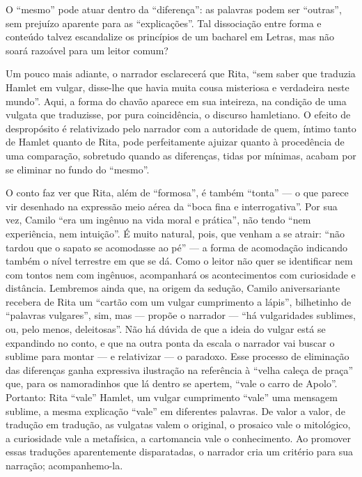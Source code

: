 O ``mesmo'' pode atuar dentro da ``diferença'': as palavras podem ser
``outras'', sem prejuízo aparente para as ``explicações''. Tal
dissociação entre forma e conteúdo talvez escandalize os princípios de
um bacharel em Letras, mas não soará razoável para um leitor comum?

Um pouco mais adiante, o narrador esclarecerá que Rita, ``sem saber que
traduzia Hamlet em vulgar, disse-lhe que havia muita cousa misteriosa e
verdadeira neste mundo''. Aqui, a forma do chavão aparece em sua
inteireza, na condição de uma vulgata que traduzisse, por pura
coincidência, o discurso hamletiano. O efeito de despropósito é
relativizado pelo narrador com a autoridade de quem, íntimo tanto de
Hamlet quanto de Rita, pode perfeitamente ajuizar quanto à procedência
de uma comparação, sobretudo quando as diferenças, tidas por mínimas,
acabam por se eliminar no fundo do ``mesmo''.

O conto faz ver que Rita, além de ``formosa'', é também ``tonta'' --- o
que parece vir desenhado na expressão meio aérea da ``boca fina e
interrogativa''. Por sua vez, Camilo ``era um ingênuo na vida moral e
prática'', não tendo ``nem experiência, nem intuição''. É muito natural,
pois, que venham a se atrair: ``não tardou que o sapato se acomodasse ao
pé'' --- a forma de acomodação indicando também o nível terrestre em que
se dá. Como o leitor não quer se identificar nem com tontos nem com
ingênuos, acompanhará os acontecimentos com curiosidade e distância.
Lembremos ainda que, na origem da sedução, Camilo aniversariante
recebera de Rita um ``cartão com um vulgar cumprimento a lápis'',
bilhetinho de ``palavras vulgares'', sim, mas --- propõe o narrador ---
``há vulgaridades sublimes, ou, pelo menos, deleitosas''. Não há dúvida
de que a ideia do vulgar está se expandindo no conto, e que na outra
ponta da escala o narrador vai buscar o sublime para montar --- e
relativizar --- o paradoxo. Esse processo de eliminação das diferenças
ganha expressiva ilustração na referência à ``velha caleça de praça''
que, para os namoradinhos que lá dentro se apertem, ``vale o carro de
Apolo''. Portanto: Rita ``vale'' Hamlet, um vulgar cumprimento ``vale''
uma mensagem sublime, a mesma explicação ``vale'' em diferentes
palavras. De valor a valor, de tradução em tradução, as vulgatas valem o
original, o prosaico vale o mitológico, a curiosidade vale a metafísica,
a cartomancia vale o conhecimento. Ao promover essas traduções
aparentemente disparatadas, o narrador cria um critério para sua
narração; acompanhemo-la.

